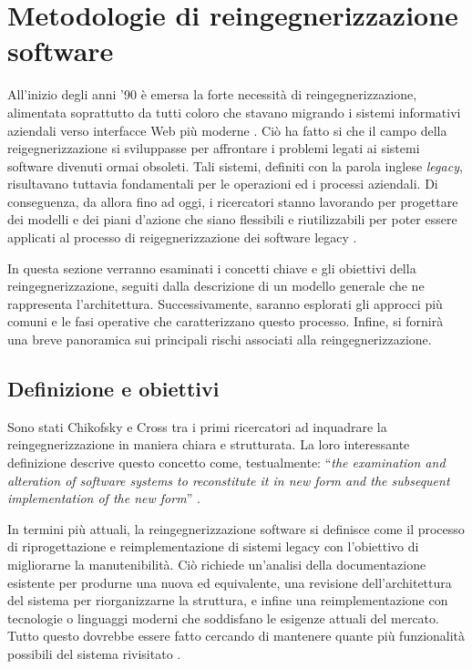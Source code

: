 \section{Metodologie di reingegnerizzazione software}
All'inizio degli anni '90 è emersa la forte necessità di reingegnerizzazione, alimentata soprattutto da tutti coloro che stavano migrando i sistemi informativi aziendali verso interfacce Web più moderne \cite{DBLP:conf/icse/MullerJSSTW00}. Ciò ha fatto si che il campo della reigegnerizzazione si sviluppasse per affrontare i problemi legati ai sistemi software divenuti ormai obsoleti. Tali sistemi, definiti con la parola inglese \emph{legacy}, risultavano tuttavia fondamentali per le operazioni ed i processi aziendali. Di conseguenza, da allora fino ad oggi, i ricercatori stanno lavorando per progettare dei modelli e dei piani d'azione che siano flessibili e riutilizzabili per poter essere applicati al processo di reigegnerizzazione dei software legacy \cite{Majthoub2018}.

In questa sezione verranno esaminati i concetti chiave e gli obiettivi della reingegnerizzazione, seguiti dalla descrizione di un modello generale che ne rappresenta l'architettura. Successivamente, saranno esplorati gli approcci più comuni e le fasi operative che caratterizzano questo processo. Infine, si fornirà una breve panoramica sui principali rischi associati alla reingegnerizzazione.

\subsection{Definizione e obiettivi}
Sono stati Chikofsky e Cross tra i primi ricercatori ad inquadrare la reingegnerizzazione in maniera chiara e strutturata. La loro interessante definizione descrive questo concetto come, testualmente: ``\textit{the examination and alteration of software systems to reconstitute it in new form and the subsequent implementation of the new form}'' \cite{DBLP:journals/software/ChikofskyC90}.

In termini più attuali, la reingegnerizzazione software si definisce come il processo di riprogettazione e reimplementazione di sistemi legacy con l'obiettivo di migliorarne la manutenibilità. Ciò richiede un'analisi della documentazione esistente per produrne una nuova ed equivalente, una revisione dell'architettura del sistema per riorganizzarne la struttura, e infine una reimplementazione con tecnologie o linguaggi moderni che soddisfano le esigenze attuali del mercato. Tutto questo dovrebbe essere fatto cercando di mantenere quante più funzionalità possibili del sistema rivisitato \cite{sommerville2011software}.

